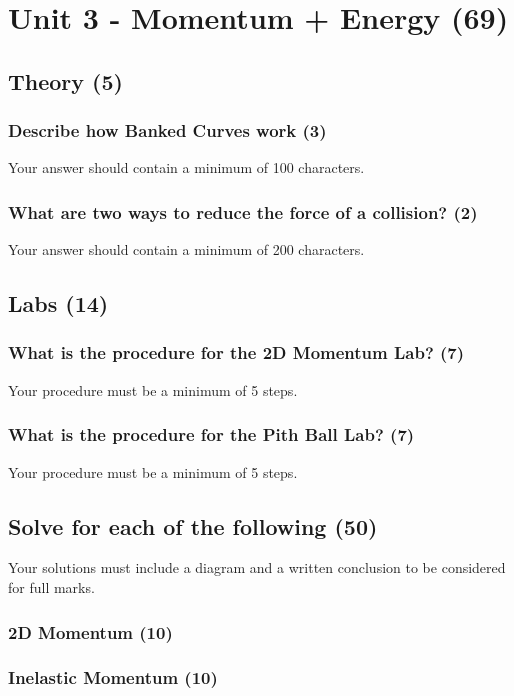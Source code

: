 \documentclass{article}
\begin{document}
\section{Unit 3 - Momentum + Energy (69)}
\subsection{Theory (5)}
\subsubsection{Describe how Banked Curves work (3)}
Your answer should contain a minimum of 100 characters.

\subsubsection{What are two ways to reduce the force of a collision? (2)}
Your answer should contain a minimum of 200 characters.

\subsection{Labs (14)}
\subsubsection{What is the procedure for the 2D Momentum Lab? (7)}
Your procedure must be a minimum of 5 steps.

\subsubsection{What is the procedure for the Pith Ball Lab? (7)}
Your procedure must be a minimum of 5 steps.

\subsection{Solve for each of the following (50)}
Your solutions must include a diagram and a written conclusion to be considered for full marks.

\subsubsection{2D Momentum (10)}
\subsubsection{Inelastic Momentum (10)}
\end{document}
